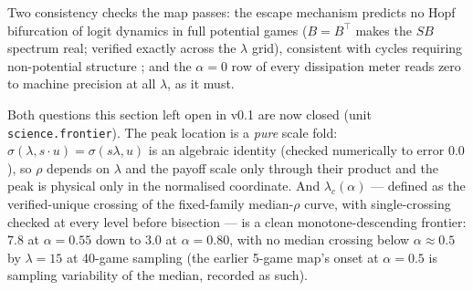 Two consistency checks the map passes: the escape mechanism predicts no Hopf
bifurcation of logit dynamics in full potential games ($B = B^\top$ makes the
$SB$ spectrum real; verified exactly across the $\lambda$ grid), consistent
with cycles requiring non-potential structure \citep{hommes2012}; and the
$\alpha = 0$ row of every dissipation meter reads zero to machine precision at
all $\lambda$, as it must.

Both questions this section left open in v0.1 are now closed (unit
\texttt{science.frontier}). The peak location is a \emph{pure} scale fold:
$\sigma(\lambda, s\cdot u) = \sigma(s\lambda, u)$ is an algebraic identity
(checked numerically to error $0.0$), so $\rho$ depends on $\lambda$ and the
payoff scale only through their product and the peak is physical only in the
normalised coordinate. And $\lambda_c(\alpha)$ --- defined as the
verified-unique crossing of the fixed-family median-$\rho$ curve, with
single-crossing checked at every level before bisection --- is a clean
monotone-descending frontier: $7.8$ at $\alpha = 0.55$ down to $3.0$ at
$\alpha = 0.80$, with no median crossing below $\alpha \approx 0.5$ by
$\lambda = 15$ at 40-game sampling (the earlier 5-game map's onset at
$\alpha = 0.5$ is sampling variability of the median, recorded as such).

